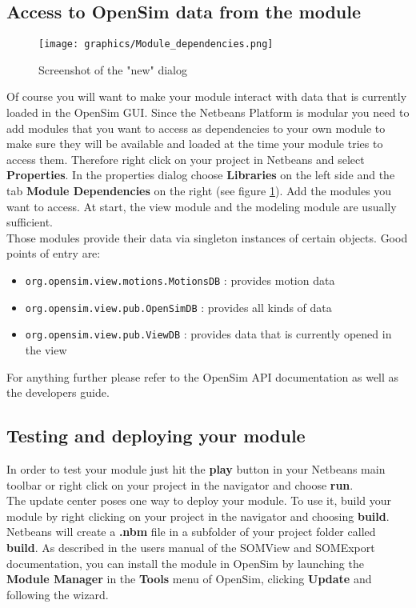 \documentclass[a4paper]{scrartcl}
\begin{document}
\subsection{Access to OpenSim data from the module}
\begin{figure}[h]
    \centering
    \texttt{[image: graphics/Module\_dependencies.png]}
    \caption{Screenshot of the "new" dialog}
    \label{fig:modules}
\end{figure}
Of course you will want to make your module interact with data that is currently loaded in the OpenSim GUI. Since the Netbeans Platform is modular you need to add modules that you want to access as dependencies to your own module to make sure they will be available and loaded at the time your module tries to access them. Therefore right click on your project in Netbeans and select \textbf{Properties}. In the properties dialog choose \textbf{Libraries} on the left side and the tab \textbf{Module Dependencies} on the right (see figure \ref{fig:modules}). Add the modules you want to access. At start, the view module and the modeling module are usually sufficient.\\
Those modules provide their data via singleton instances of certain objects.
Good points of entry are:
\begin{itemize}
    \item \verb|org.opensim.view.motions.MotionsDB| : provides motion data
    \item \verb|org.opensim.view.pub.OpenSimDB| : provides all kinds of data
    \item \verb|org.opensim.view.pub.ViewDB| : provides data that is currently opened in the view
\end{itemize}
For anything further please refer to the OpenSim API documentation as well as the developers guide.

\subsection{Testing and deploying your module}
In order to test your module just hit the \textbf{play} button in your Netbeans main toolbar or right click on your project in the navigator and choose \textbf{run}.\\
The update center poses one way to deploy your module. 
To use it, build your module by right clicking on your project in the navigator and choosing \textbf{build}.
Netbeans will create a \textbf{.nbm} file in a subfolder of your project folder called \textbf{build}.
As described in the users manual of the SOMView and SOMExport documentation, you can install the module in OpenSim by launching the \textbf{Module Manager} in the \textbf{Tools} menu of OpenSim, clicking \textbf{Update} and following the wizard.
\end{document}
